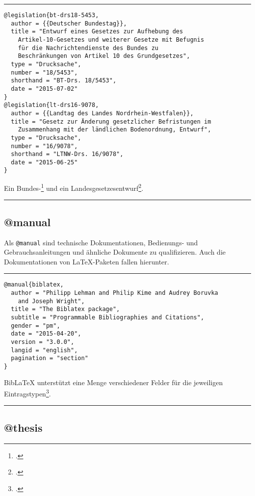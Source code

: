 \documentclass[11pt,a4paper,DIV=calc]{scrartcl}
\newcommand\software[1]{\textsf{#1}}
\newcommand\Biblatex{\software{Bib\LaTeX{}}\xspace}
\newenvironment{rubexample}{\par\vspace{\baselineskip}\hrule\par\begin{refsection}}{\end{refsection}\par\hrule\par\vspace{\baselineskip}}
\begin{document}
\begin{rubexample}
\begin{verbatim}
@legislation{bt-drs18-5453,
  author = {{Deutscher Bundestag}},
  title = "Entwurf eines Gesetzes zur Aufhebung des
    Artikel-10-Gesetzes und weiterer Gesetze mit Befugnis
    für die Nachrichtendienste des Bundes zu
    Beschränkungen von Artikel 10 des Grundgesetzes",
  type = "Drucksache",
  number = "18/5453",
  shorthand = "BT-Drs. 18/5453",
  date = "2015-07-02"
}
@legislation{lt-drs16-9078,
  author = {{Landtag des Landes Nordrhein-Westfalen}},
  title = "Gesetz zur Änderung gesetzlicher Befristungen im
    Zusammenhang mit der ländlichen Bodenordnung, Entwurf",
  type = "Drucksache",
  number = "16/9078",
  shorthand = "LTNW-Drs. 16/9078",
  date = "2015-06-25"
}
\end{verbatim}

Ein Bundes-\footcite{bt-drs18-5453} und ein
Landesgesetzesentwurf\footcite[9]{lt-drs16-9078}.

\printbibliography
\end{rubexample}

\subsection{@manual}

Als \verb+@manual+ sind technische Dokumentationen,
Bedienungs- und Gebrauchsanleitungen und ähnliche Dokumente zu
qualifizieren. Auch die Dokumentationen von \LaTeX{}-Pa\-ke\-ten
fallen hierunter.

\begin{rubexample}
\begin{verbatim}
@manual{biblatex,
  author = "Philipp Lehman and Philip Kime and Audrey Boruvka
    and Joseph Wright",
  title = "The Biblatex package",
  subtitle = "Programmable Bibliographies and Citations",
  gender = "pm",
  date = "2015-04-20",
  version = "3.0.0",
  langid = "english",
  pagination = "section"
}
\end{verbatim}

\Biblatex unterstützt eine Menge verschiedener Felder für die
jeweiligen Eintragstypen\footcite[2.2.2]{biblatex}.

\printbibliography
\end{rubexample}

\subsection{@thesis}
\end{document}
